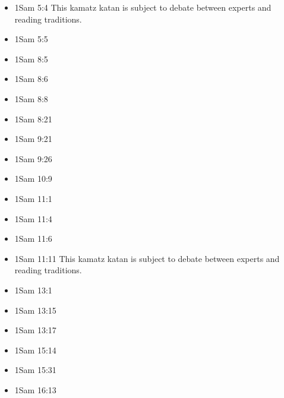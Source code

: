 \documentclass[14pt]{book}
\begin{document}
\begin{multicols}{2}
\begin{itemize}
							\item 1Sam 5:4 This kamatz katan is subject to debate between experts and reading traditions.
							
							\item 1Sam 5:5
							
							\item 1Sam 8:5
							
							\item 1Sam 8:6
							
							\item 1Sam 8:8
							
							\item 1Sam 8:21
							
							\item 1Sam 9:21
							
							\item 1Sam 9:26
							
							\item 1Sam 10:9
							
							\item 1Sam 11:1
							
							\item 1Sam 11:4
							
							\item 1Sam 11:6
							
							\item 1Sam 11:11 This kamatz katan is subject to debate between experts and reading traditions.
							
							\item 1Sam 13:1
							
							\item 1Sam 13:15
							
							\item 1Sam 13:17
							
							\item 1Sam 15:14
							
							\item 1Sam 15:31
							
							\item 1Sam 16:13
							

\end{itemize}
\end{multicols}
\end{document}
